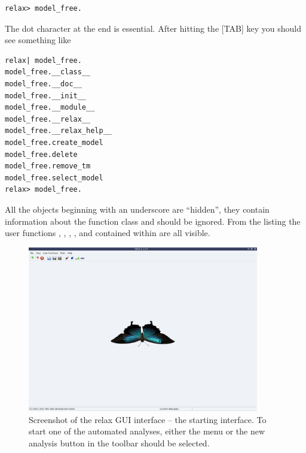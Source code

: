 \begin{lstlisting}[numbers=none]
relax> model_free.
\end{lstlisting}

The dot character at the end is essential.  After hitting the [TAB] key you should see something like

\begin{lstlisting}[numbers=none]
relax| model_free.
model_free.__class__
model_free.__doc__
model_free.__init__
model_free.__module__
model_free.__relax__
model_free.__relax_help__
model_free.create_model
model_free.delete
model_free.remove_tm
model_free.select_model
relax> model_free.
\end{lstlisting}

All the objects beginning with an underscore are ``hidden'', they contain information about the function class and should be ignored.  From the listing the user functions , , , , and  contained within  are all visible.

\begin{figure}
\centerline{\includegraphics[width=0.9\textwidth, bb=14 14 1065 768]{graphics/screenshots/start}}
\caption[GUI screenshot]{Screenshot of the relax GUI interface -- the starting interface.  To start one of the automated analyses, either the menu  or the new analysis button in the toolbar should be selected.}\label{fig: GUI screenshot - start}
\end{figure}




